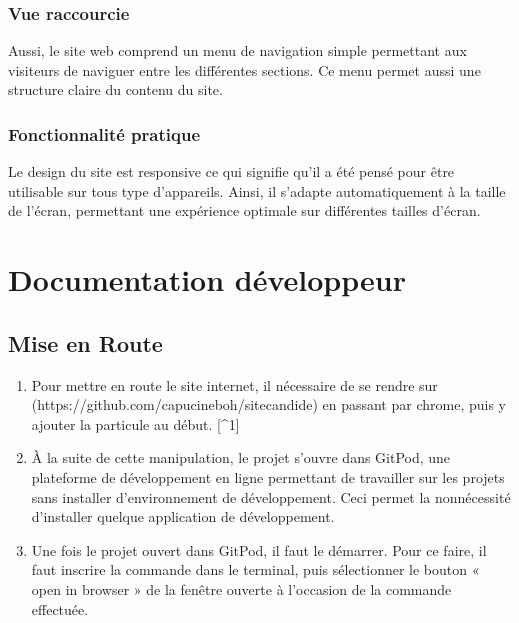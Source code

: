 \documentclass[a4,10pt,french]{sphinxmanual}
\begin{document}
\subsection{Vue raccourcie}
\label{\detokenize{chapitre-01:vue-raccourcie}}
\sphinxAtStartPar
Aussi, le site web comprend un menu de navigation simple permettant aux visiteurs de naviguer entre les différentes sections. Ce menu permet aussi une structure claire du contenu du site.


\subsection{Fonctionnalité pratique}
\label{\detokenize{chapitre-01:fonctionnalite-pratique}}
\sphinxAtStartPar
Le design du site est responsive ce qui signifie qu’il a été pensé pour être utilisable sur tous type d’appareils. Ainsi, il s’adapte automatiquement à la taille de l’écran, permettant une expérience optimale sur différentes tailles d’écran.

\sphinxAtStartPar



\chapter{Documentation développeur}
\label{\detokenize{chapitre-02:documentation-developpeur}}\label{\detokenize{chapitre-02::doc}}

\section{Mise en Route}
\label{\detokenize{chapitre-02:mise-en-route}}\begin{enumerate}
%
\item {} 
\sphinxAtStartPar
Pour mettre en route le site internet, il nécessaire de se rendre sur  (https://github.com/capucineboh/site\sphinxhyphen{}candide) en passant par chrome, puis y ajouter la particule  au début.   {[}\textasciicircum{}1{]}

\item {} 
\sphinxAtStartPar
À la suite de cette manipulation, le projet s’ouvre dans GitPod, une plateforme de développement en ligne permettant de travailler sur les projets sans installer d’environnement de développement. Ceci permet la non\sphinxhyphen{}nécessité d’installer quelque application de développement.

\item {} 
\sphinxAtStartPar
Une fois le projet ouvert dans GitPod, il faut le démarrer. Pour ce faire, il faut inscrire la commande  dans le terminal, puis sélectionner le bouton « open in browser » de la fenêtre ouverte à l’occasion de la commande effectuée.

\end{enumerate}
\end{document}
